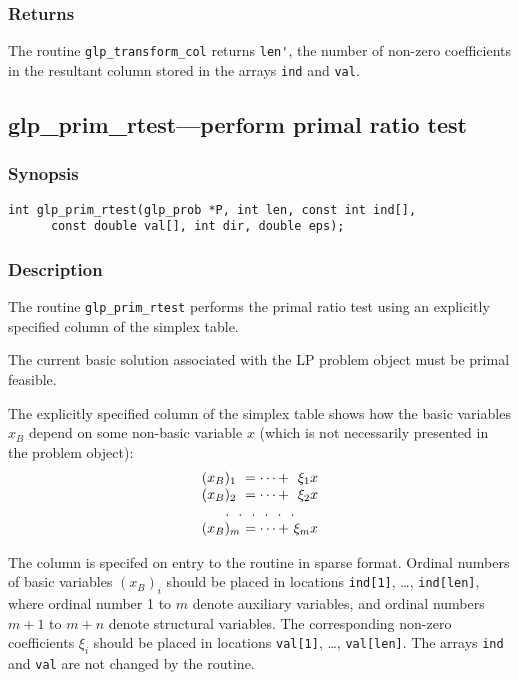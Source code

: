 \subsubsection*{Returns}

The routine \verb|glp_transform_col| returns \verb|len'|, the number of
non-zero coefficients in the resultant column stored in the arrays
\verb|ind| and \verb|val|.

\subsection{glp\_prim\_rtest---perform primal ratio test}

\subsubsection*{Synopsis}

\begin{verbatim}
int glp_prim_rtest(glp_prob *P, int len, const int ind[],
      const double val[], int dir, double eps);
\end{verbatim}

\subsubsection*{Description}

The routine \verb|glp_prim_rtest| performs the primal ratio test using
an explicitly specified column of the simplex table.

The current basic solution associated with the LP problem object must be
primal feasible.

The explicitly specified column of the simplex table shows how the basic
variables $x_B$ depend on some non-basic variable $x$ (which is not
necessarily presented in the problem object):
$$
\begin{array}{l@{\ }c@{\ }r}
(x_B)_1&=\dots+&\xi_{1}x\\
(x_B)_2&=\dots+&\xi_{2}x\\
\multicolumn{3}{c}{.\ \ .\ \ .\ \ .\ \ .\ \ .}\\
(x_B)_m&=\dots+&\xi_{m}x\\
\end{array}
$$

The column is specifed on entry to the routine in sparse format. Ordinal
numbers of basic variables $(x_B)_i$ should be placed in locations
\verb|ind[1]|, \dots, \verb|ind[len]|, where ordinal number 1 to $m$
denote auxiliary variables, and ordinal numbers $m+1$ to $m+n$ denote
structural variables. The corresponding non-zero coefficients $\xi_i$
should be placed in locations \verb|val[1]|, \dots, \verb|val[len]|. The
arrays \verb|ind| and \verb|val| are not changed by the routine.

